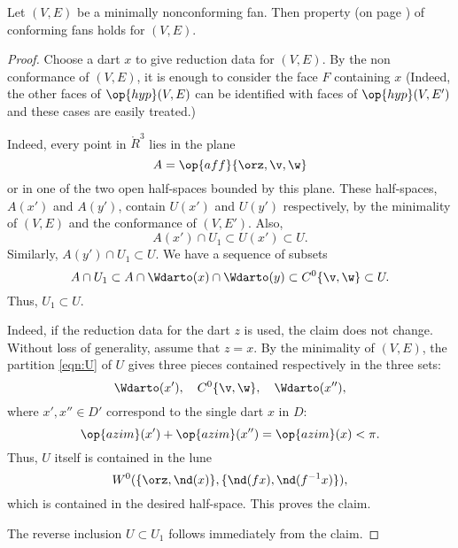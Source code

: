 
\begin{lemma}[]\cutrate{} Let $(V,E)$ be a minimally nonconforming fan.  Then property  (on page \pageref{halfspace:conformance}) of conforming fans
holds for $(V,E)$.
\end{lemma}
%

\begin{proof}
  Choose a dart $x$ to give reduction data for $(V,E)$.  By the non
  conformance of $(V,E)$, it is enough to consider the face $F$
  containing $x$ (Indeed, the other faces of $\op{hyp}(V,E)$ can be
  identified with faces of $\op{hyp}(V,E')$ and these cases are easily
  treated.)  

    Indeed, every point in
  $\ring{R}^3$ lies in the plane
\[ 
A=\op{aff}\{\orz,\v,\w\}
\] 
or in one of the two open half-spaces bounded by this plane.  These
half-spaces, $A(x')$ and $A(y')$, contain $U(x')$ and $U(y')$
respectively, by the minimality of $(V,E)$ and the conformance of $(V,E')$.  Also,
\[ 
A(x')\cap U_1 \subset U(x')\subset U.
\] 
Similarly, $A(y')\cap U_1 \subset U$.  We have a sequence of subsets
\[ 
A \cap U_1 \subset A \cap \Wdarto(x) \cap \Wdarto(y) \subset C^0\{\v,\w\} \subset U.
\] 
Thus,
$U_1\subset U$.

 Indeed,
if the reduction data for the dart $z$ is used, the claim does not change.
Without loss of generality, assume that $z=x$.  By the minimality of $(V,E)$, the
partition \eqref{eqn:U} of $U$ gives three pieces contained respectively
in the three sets:
\[ 
\Wdarto(x'),\quad C^0\{\v,\w\},\quad \Wdarto(x''),
\] 
where $x',x''\in D'$ correspond to the single dart $x$ in $D$:
\[ 
\op{azim}(x') + \op{azim}(x'') = \op{azim}(x) < \pi.
\] 
Thus, $U$ itself is contained in the lune
\[ 
W^0(\{\orz,\nd(x)\},\{\nd(f x),\nd(f^{-1} x)\}),
\] 
which is contained in the desired half-space.  This proves the claim.

The reverse inclusion $U\subset U_1$ follows immediately from the claim.
\end{proof}

